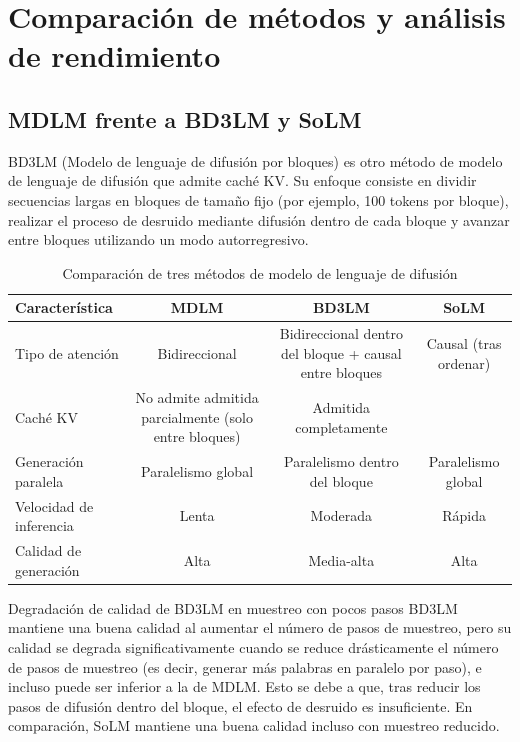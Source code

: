 \section{Comparación de métodos y análisis de rendimiento}

\subsection{MDLM frente a BD3LM y SoLM}

BD3LM (Modelo de lenguaje de difusión por bloques) es otro método de modelo de lenguaje de difusión que admite caché KV. Su enfoque consiste en dividir secuencias largas en bloques de tamaño fijo (por ejemplo, 100 tokens por bloque), realizar el proceso de desruido mediante difusión dentro de cada bloque y avanzar entre bloques utilizando un modo autorregresivo.

\begin{table}[H]
\centering
\caption{Comparación de tres métodos de modelo de lenguaje de difusión}
\begin{tabular}{@{}lccc@{}}
\toprule
\textbf{Característica} & \textbf{MDLM} & \textbf{BD3LM} & \textbf{SoLM} \\
\midrule
Tipo de atención & Bidireccional & Bidireccional dentro del bloque + causal entre bloques & Causal (tras ordenar) \\
Caché KV & No admite admitida parcialmente (solo entre bloques) & Admitida completamente \\
Generación paralela & Paralelismo global & Paralelismo dentro del bloque & Paralelismo global \\
Velocidad de inferencia & Lenta & Moderada & Rápida \\
Calidad de generación & Alta & Media-alta & Alta \\
\bottomrule
\end{tabular}
\end{table}

\begin{warningbox}{Degradación de calidad de BD3LM en muestreo con pocos pasos}
BD3LM mantiene una buena calidad al aumentar el número de pasos de muestreo, pero su calidad se degrada significativamente cuando se reduce drásticamente el número de pasos de muestreo (es decir, generar más palabras en paralelo por paso), e incluso puede ser inferior a la de MDLM. Esto se debe a que, tras reducir los pasos de difusión dentro del bloque, el efecto de desruido es insuficiente. En comparación, SoLM mantiene una buena calidad incluso con muestreo reducido.
\end{warningbox}

